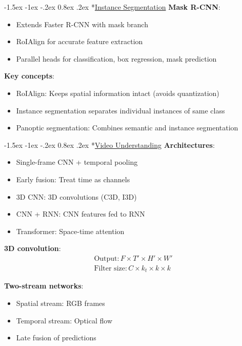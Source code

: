 \documentclass{article}
\makeatletter
\renewcommand\section{\@startsection{section}{1}{\z@}%
                                  {-1.5ex \@plus -1ex \@minus -.2ex}%
                                  {0.8ex \@plus.2ex}%
                                  {\normalfont\small\bfseries}}
\makeatother
\begin{document}
\begin{multicols}{3}
\section*{\underline{Instance Segmentation}}
\textbf{Mask R-CNN}:
\begin{itemize}
\item Extends Faster R-CNN with mask branch
\item RoIAlign for accurate feature extraction
\item Parallel heads for classification, box regression, mask prediction
\end{itemize}

\textbf{Key concepts}:
\begin{itemize}
\item RoIAlign: Keeps spatial information intact (avoids quantization)
\item Instance segmentation separates individual instances of same class
\item Panoptic segmentation: Combines semantic and instance segmentation
\end{itemize}

\section*{\underline{Video Understanding}}
\textbf{Architectures}:
\begin{itemize}
\item Single-frame CNN + temporal pooling
\item Early fusion: Treat time as channels
\item 3D CNN: 3D convolutions (C3D, I3D)
\item CNN + RNN: CNN features fed to RNN
\item Transformer: Space-time attention
\end{itemize}

\textbf{3D convolution}: 
\begin{align*}
\text{Output}: F \times T' \times H' \times W'\\
\text{Filter size}: C \times k_t \times k \times k
\end{align*}

\textbf{Two-stream networks}:
\begin{itemize}
\item Spatial stream: RGB frames
\item Temporal stream: Optical flow
\item Late fusion of predictions
\end{itemize}


\end{multicols}
\end{document}
